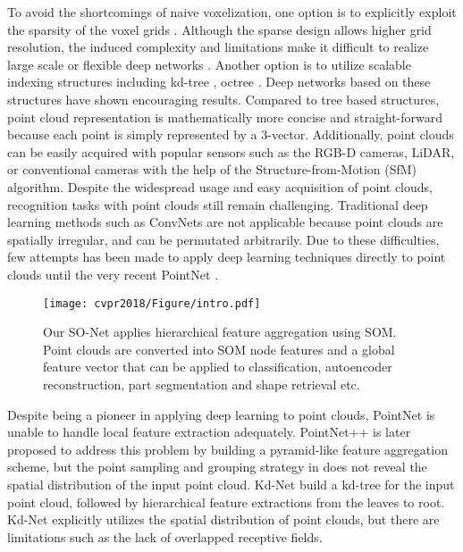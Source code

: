 \documentclass[10pt,twocolumn,letterpaper]{article}
\begin{document}
To avoid the shortcomings of naive voxelization, one option is to explicitly exploit the sparsity of the voxel grids \cite{wang2015voting, li2016fpnn, engelcke2017vote3deep}. Although the sparse design allows higher grid resolution, the induced complexity and limitations make it difficult to realize large scale or flexible deep networks \cite{Riegler2017OctNet}. Another option is to utilize scalable indexing structures including kd-tree \cite{bentley1975multidimensional}, octree \cite{meagher1980octree}. Deep networks based on these structures have shown encouraging results. Compared to tree based structures, point cloud representation is mathematically more concise and straight-forward because each point is simply represented by a 3-vector. Additionally, point clouds can be easily acquired with popular sensors such as the RGB-D cameras, LiDAR, or conventional cameras with the help of the Structure-from-Motion (SfM) algorithm. Despite the widespread usage and easy acquisition of point clouds, recognition tasks with point clouds still remain challenging. Traditional deep learning methods such as ConvNets are not applicable because point clouds are spatially irregular, and can be permutated arbitrarily. Due to these difficulties, few attempts has been made to apply deep learning techniques directly to point clouds until the very recent PointNet \cite{qi2016pointnet}. 

\begin{figure}[t] \centering
\texttt{[image: cvpr2018/Figure/intro.pdf]}
\caption{Our SO-Net applies hierarchical feature aggregation using SOM. Point clouds are converted into SOM node features and a global feature vector that can be applied to classification, autoencoder reconstruction, part segmentation and shape retrieval etc. 
} \label{fig_intro}
\vspace{-4pt}
\end{figure}


Despite being a pioneer in applying deep learning to point clouds, PointNet is unable to handle local feature extraction adequately. PointNet++ \cite{qi2017pointnet++} is later proposed to address this problem by building a pyramid-like feature aggregation scheme, but the point sampling and grouping strategy in \cite{qi2017pointnet++} does not reveal the spatial distribution of the input point cloud. Kd-Net \cite{klokov2017escape} build a kd-tree for the input point cloud, followed by hierarchical feature extractions from the leaves to root. Kd-Net explicitly utilizes the spatial distribution of point clouds, but there are limitations such as the lack of overlapped receptive fields.
\end{document}
